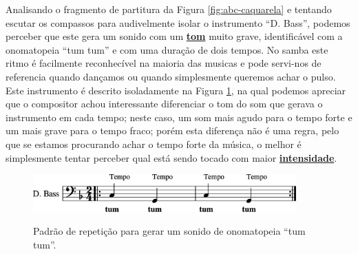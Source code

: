 Analisando o fragmento de partitura da Figura \ref{fig:abc-caquarela} 
e tentando escutar os compassos 
para audivelmente isolar o instrumento ``D. Bass'',
podemos perceber que este gera um sonido 
com um \hyperref[sec:pos:Altura]{\textbf{tom}} muito grave, 
identificável com a onomatopeia ``tum tum'' e com uma duração de dois tempos.
No samba este ritmo é facilmente reconhecível na maioria das musicas 
e pode servi-nos de referencia quando dançamos ou quando simplesmente queremos achar o pulso.
Este instrumento é descrito isoladamente na Figura \ref{fig:abc-tum-tum-1},
na qual podemos apreciar que o compositor achou interessante diferenciar 
o tom do som que gerava o instrumento em cada tempo;
neste caso, um som mais agudo para o tempo forte e um mais grave para o tempo fraco;
porém esta diferença não é uma regra, pelo que se estamos procurando achar o tempo forte da música,
o melhor é simplesmente tentar perceber qual está sendo tocado com maior \hyperref[sec:pos:Intensidade]{\textbf{intensidade}}.
\begin{figure}[ht]
\centering
\href{https://drive.google.com/file/d/1uVEoBXD-itWcbqlr6CRrkShvS-ivBz7K/view?usp=sharing}{\includegraphics[width=0.9\textwidth]{chapters/cap-musicalidade-percepcion/abc-tum-tum-1.eps}}

\caption{Padrão de repetição para gerar um sonido de onomatopeia ``tum tum''.}
\label{fig:abc-tum-tum-1}
\end{figure}

